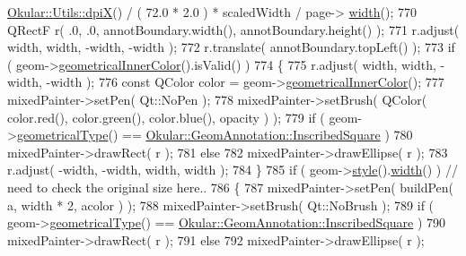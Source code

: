 \begin{DoxyCode}
      \hyperlink{classOkular_1_1Utils_acd9a3685415399561c6cde450ead4710}{Okular::Utils::dpiX}() / ( 72.0 * 2.0 ) * scaledWidth / page->
      \hyperlink{classOkular_1_1Page_a57114e88281da2a51b1bb0d5d4996d53}{width}();
770                     QRectF r( .0, .0, annotBoundary.width(), annotBoundary.height() );
771                     r.adjust( width, width, -width, -width );
772                     r.translate( annotBoundary.topLeft() );
773                     \textcolor{keywordflow}{if} ( geom->\hyperlink{classOkular_1_1GeomAnnotation_a5c84e1cbdf0d2bb6b75b6d6b049af63b}{geometricalInnerColor}().isValid() )
774                     \{
775                         r.adjust( width, width, -width, -width );
776                         \textcolor{keyword}{const} QColor color = geom->\hyperlink{classOkular_1_1GeomAnnotation_a5c84e1cbdf0d2bb6b75b6d6b049af63b}{geometricalInnerColor}();
777                         mixedPainter->setPen( Qt::NoPen );
778                         mixedPainter->setBrush( QColor( color.red(), color.green(), color.blue(), opacity )
       );
779                         \textcolor{keywordflow}{if} ( geom->\hyperlink{classOkular_1_1GeomAnnotation_adeae1cc4b72aed7e9705b51f91f8555f}{geometricalType}() == 
      \hyperlink{classOkular_1_1GeomAnnotation_a511623ed10a8d1f18cfd5987fadee682a5c7718299cc7aad186005a1bd0c86e9e}{Okular::GeomAnnotation::InscribedSquare} )
780                             mixedPainter->drawRect( r );
781                         \textcolor{keywordflow}{else}
782                             mixedPainter->drawEllipse( r );
783                         r.adjust( -width, -width, width, width );
784                     \}
785                     \textcolor{keywordflow}{if} ( geom->\hyperlink{classOkular_1_1Annotation_ae1f845ddbd6d524b2b388c6c9ef26423}{style}().\hyperlink{classOkular_1_1Annotation_1_1Style_a5a8e23f3a4f95e25f45770937dc82948}{width}() ) \textcolor{comment}{// need to check the original size here..}
786                     \{
787                         mixedPainter->setPen( buildPen( a, width * 2, acolor ) );
788                         mixedPainter->setBrush( Qt::NoBrush );
789                         \textcolor{keywordflow}{if} ( geom->\hyperlink{classOkular_1_1GeomAnnotation_adeae1cc4b72aed7e9705b51f91f8555f}{geometricalType}() == 
      \hyperlink{classOkular_1_1GeomAnnotation_a511623ed10a8d1f18cfd5987fadee682a5c7718299cc7aad186005a1bd0c86e9e}{Okular::GeomAnnotation::InscribedSquare} )
790                             mixedPainter->drawRect( r );
791                         \textcolor{keywordflow}{else}
792                             mixedPainter->drawEllipse( r );

\end{DoxyCode}
